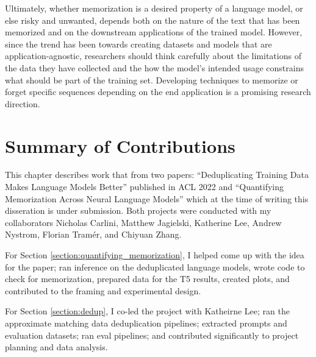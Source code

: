 Ultimately, whether memorization is a desired property of a language model, or else risky and unwanted, depends
both on the nature of the text that has been memorized and on the downstream applications of the trained model.
However, since the trend has been towards creating datasets and models that are application-agnostic, researchers should think carefully about the limitations of the data they have collected and the how the model's intended usage constrains what should be part of the training set. 
Developing techniques to memorize or forget specific sequences depending on the end application is a promising research direction. 


\section{Summary of Contributions}
This chapter describes work that from two papers: ``Deduplicating Training Data Makes Language Models Better'' published in ACL 2022 and ``Quantifying Memorization Across Neural Language Models'' which at the time of writing this disseration is under submission.
Both projects were conducted with my collaborators Nicholas Carlini, Matthew Jagielski, Katherine Lee, Andrew Nystrom, Florian Tram\'er, and Chiyuan Zhang.

For Section \ref{section:quantifying_memorization}, I helped come up with the idea for the paper; ran inference on the deduplicated language models, wrote code to check for memorization, prepared data for the T5 results, created plots, and contributed to the framing and experimental design. 

For Section \ref{section:dedup}, I co-led the project with Katheirne Lee; ran the approximate matching data deduplication pipelines; extracted prompts and evaluation datasets; ran eval pipelines; and contributed significantly to project planning and data analysis.